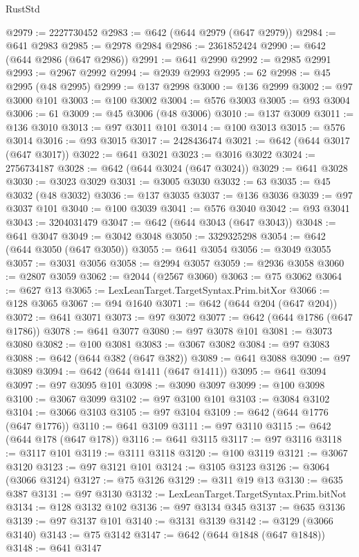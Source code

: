 \begin{lexlean}{RustStd}
\begin{coremodule}
@2979 := 2227730452
@2983 := @642 (@644 @2979 (@647 @2979))
@2984 := @641 @2983
@2985 := @2978 @2984
@2986 := 2361852424
@2990 := @642 (@644 @2986 (@647 @2986))
@2991 := @641 @2990
@2992 := @2985 @2991
@2993 := @2967 @2992
@2994 := @2939 @2993
@2995 := 62
@2998 := @45 @2995 (@48 @2995)
@2999 := @137 @2998
@3000 := @136 @2999
@3002 := @97 @3000 @101
@3003 := @100 @3002
@3004 := @576 @3003
@3005 := @93 @3004
@3006 := 61
@3009 := @45 @3006 (@48 @3006)
@3010 := @137 @3009
@3011 := @136 @3010
@3013 := @97 @3011 @101
@3014 := @100 @3013
@3015 := @576 @3014
@3016 := @93 @3015
@3017 := 2428436474
@3021 := @642 (@644 @3017 (@647 @3017))
@3022 := @641 @3021
@3023 := @3016 @3022
@3024 := 2756734187
@3028 := @642 (@644 @3024 (@647 @3024))
@3029 := @641 @3028
@3030 := @3023 @3029
@3031 := @3005 @3030
@3032 := 63
@3035 := @45 @3032 (@48 @3032)
@3036 := @137 @3035
@3037 := @136 @3036
@3039 := @97 @3037 @101
@3040 := @100 @3039
@3041 := @576 @3040
@3042 := @93 @3041
@3043 := 3204031479
@3047 := @642 (@644 @3043 (@647 @3043))
@3048 := @641 @3047
@3049 := @3042 @3048
@3050 := 3329325298
@3054 := @642 (@644 @3050 (@647 @3050))
@3055 := @641 @3054
@3056 := @3049 @3055
@3057 := @3031 @3056
@3058 := @2994 @3057
@3059 := @2936 @3058
@3060 := @2807 @3059
@3062 := @2044 (@2567 @3060)
@3063 := @75 @3062
@3064 := @627 @13
@3065 := LexLeanTarget.TargetSyntax.Prim.bitXor
@3066 := @128 @3065
@3067 := @94 @1640
@3071 := @642 (@644 @204 (@647 @204))
@3072 := @641 @3071
@3073 := @97 @3072
@3077 := @642 (@644 @1786 (@647 @1786))
@3078 := @641 @3077
@3080 := @97 @3078 @101
@3081 := @3073 @3080
@3082 := @100 @3081
@3083 := @3067 @3082
@3084 := @97 @3083
@3088 := @642 (@644 @382 (@647 @382))
@3089 := @641 @3088
@3090 := @97 @3089
@3094 := @642 (@644 @1411 (@647 @1411))
@3095 := @641 @3094
@3097 := @97 @3095 @101
@3098 := @3090 @3097
@3099 := @100 @3098
@3100 := @3067 @3099
@3102 := @97 @3100 @101
@3103 := @3084 @3102
@3104 := @3066 @3103
@3105 := @97 @3104
@3109 := @642 (@644 @1776 (@647 @1776))
@3110 := @641 @3109
@3111 := @97 @3110
@3115 := @642 (@644 @178 (@647 @178))
@3116 := @641 @3115
@3117 := @97 @3116
@3118 := @3117 @101
@3119 := @3111 @3118
@3120 := @100 @3119
@3121 := @3067 @3120
@3123 := @97 @3121 @101
@3124 := @3105 @3123
@3126 := @3064 (@3066 @3124)
@3127 := @75 @3126
@3129 := @311 @19 @13
@3130 := @635 @387
@3131 := @97 @3130
@3132 := LexLeanTarget.TargetSyntax.Prim.bitNot
@3134 := @128 @3132 @102
@3136 := @97 @3134 @345
@3137 := @635 @3136
@3139 := @97 @3137 @101
@3140 := @3131 @3139
@3142 := @3129 (@3066 @3140)
@3143 := @75 @3142
@3147 := @642 (@644 @1848 (@647 @1848))
@3148 := @641 @3147

\end{coremodule}
\end{lexlean}
